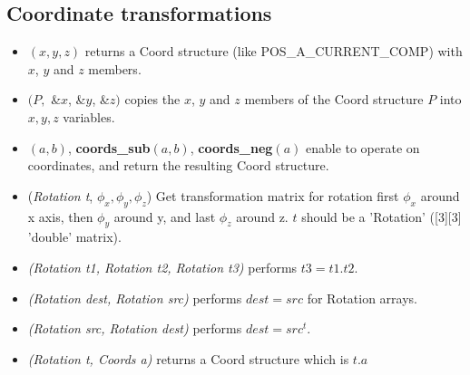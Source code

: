 \subsection{Coordinate transformations}
\begin{itemize}
\item {}$(x,y,z)$ returns a Coord structure (like POS\_A\_CURRENT\_COMP) with $x$, $y$ and $z$ members.
\item {}$(P,$ \&$x$, \&$y$, \&$z)$ copies the $x$, $y$ and
$z$ members of the Coord structure $P$ into $x,y,z$ variables.
\item {}$(a,b)$, \textbf{coords\_sub}$(a,b)$, \textbf{
coords\_neg}$(a)$ enable to  operate on coordinates, and return the
resulting Coord structure.
\item {}(\textit{Rotation t}, $\phi_x, \phi_y, \phi_z$)
  Get transformation matrix for rotation
  first $\phi_x$ around x axis, then $\phi_y$ around y,
  and last $\phi_z$ around z. $t$ should be a 'Rotation' ([3][3] 'double' matrix).
\item {}\textit{(Rotation t1, Rotation t2, Rotation t3)} performs $t3 = t1 . t2$.
\item {}\textit{(Rotation dest, Rotation src)} performs $dest = src$ for Rotation arrays.
\item {}\textit{(Rotation src, Rotation dest)} performs $dest = src^t$.
\item {}\textit{(Rotation t, Coords a)} returns a Coord structure which is $t.a$
\end{itemize}


